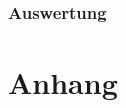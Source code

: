 \documentclass[11pt,a4paper]{article}
\begin{document}
\subsubsection{Auswertung}


\section{Anhang}

%
%
%
\end{document}
